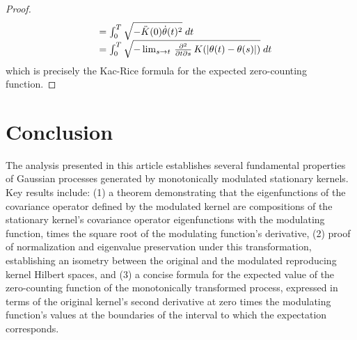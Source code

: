 \documentclass{mc}
\begin{document}
\begin{proof}
\begin{equation}
\begin{array}{ll}
      & = \int_0^T \sqrt{- \ddot{K} (0) \dot{\theta} (t)^2}  \hspace{0.27em}
      dt\\
      & = \int_0^T \sqrt{- \lim_{s \to t}  \hspace{0.17em}
      \frac{\partial^2}{\partial t \partial s}  \hspace{0.17em} K (| \theta
      (t) - \theta (s) |)}  \hspace{0.27em} dt
    \end{array}
  \end{equation}
  which is precisely the Kac-Rice formula for the expected zero-counting
  function.
\end{proof}

\section{Conclusion}

The analysis presented in this article establishes several fundamental
properties of Gaussian processes generated by monotonically modulated
stationary kernels. Key results include: (1) a theorem demonstrating that the
eigenfunctions of the covariance operator defined by the modulated kernel are 
compositions of the stationary kernel's covariance operator eigenfunctions with 
the modulating function, times the square root of the modulating function's 
derivative, (2) proof of normalization and eigenvalue preservation under this 
transformation, establishing an isometry between the original and the modulated 
reproducing kernel Hilbert spaces, and (3) a concise formula for the expected value 
of the zero-counting function of the monotonically transformed process, expressed 
in terms of the original kernel's second derivative at zero times the modulating function's
values at the boundaries of the interval to which the expectation corresponds.



\end{document}
